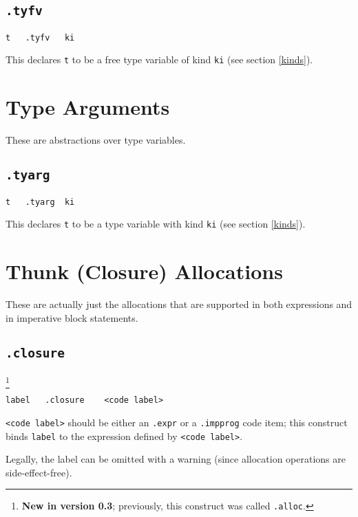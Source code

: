 \documentclass{report}
\newcommand\stringcode[1]{\texttt{#1}}
\newcommand\new[2]{\footnote{\textbf{New in version #1}; previously, #2}}
\begin{document}
\subsection{\stringcode{.tyfv}}

\begin{verbatim}
t	.tyfv	ki
\end{verbatim}

This declares \stringcode{t} to be a free type variable of kind \stringcode{ki} (see section \ref{kinds}).

\section{Type Arguments}
\label{code_type_arg}

These are abstractions over type variables.

\subsection{\stringcode{.tyarg}}

\begin{verbatim}
t	.tyarg	ki
\end{verbatim}

This declares \stringcode{t} to be a type variable with kind \stringcode{ki}  (see section \ref{kinds}).

\section{Thunk (Closure) Allocations}
\label{thunk_alloc}

These are actually just the allocations that are supported in both expressions and in imperative block statements.

\subsection{\stringcode{.closure}}
\new{0.3}{this construct was called \stringcode{.alloc}.}

\begin{verbatim}
label	.closure	<code label>
\end{verbatim}

\stringcode{<code label>} should be either an \stringcode{.expr} or a \stringcode{.impprog} code item;
this construct binds \stringcode{label} to the expression defined by \stringcode{<code label>}.

Legally, the label can be omitted with a warning (since allocation operations are side-effect-free).
\end{document}
